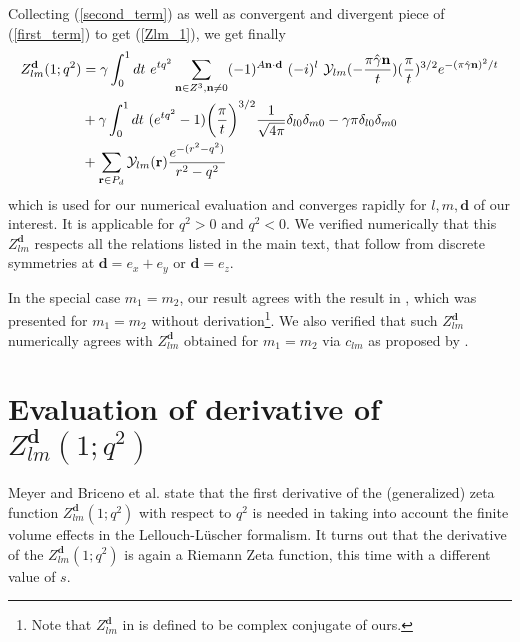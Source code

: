 \documentclass[a4paper,12pt]{book}
\begin{document}
Collecting (\ref{second_term}) as well as convergent and divergent piece of (\ref{first_term}) to get (\ref{Zlm_1}), we get  finally 
\begin{align}
Z_{lm}^{\mathbf{d}}(1;q^2)&=  \gamma \int _0^1 dt~ e^{tq^2} \sum_{\mathbf{n}\in Z^3,\mathbf{n}\not=0}   (-1)^{A\mathbf{n\cdot d}}~(-i)^l~ {\cal Y}_{lm}(-\frac{\pi\hat \gamma \mathbf{n}}{t}) (\frac{\pi}{t})^{3/2}  e^{-(\pi \hat \gamma \mathbf{n})^2/t}\nonumber \\
 &+\gamma  \int_0^1 dt~(e^{tq^2}-1)\biggl(\frac{\pi}{t}\biggr)^{3/2} \frac{1}{\sqrt{4\pi}}\delta_{l0}\delta_{m0}-\gamma\pi\delta_{l0}\delta_{m0}\nonumber\\
&+\sum_{\mathbf{r}\in P_{d}} {\cal Y}_{lm}(\mathbf{r}) \frac{e^{-(r^2-q^2)}}{r^2-q^2}\ 
\end{align}
which is used for our numerical evaluation and converges rapidly for $l,m,\mathbf{d}$  of our interest. It is applicable for $q^2>0$ and $q^2<0$. We verified numerically that this $Z_{lm}^{\mathbf{d}}$ respects all the relations listed in the main text, that follow from discrete symmetries at $\mathbf{d}=e_x+e_y$ or $\mathbf{d}=e_z$.   
 
In the special case $m_1=m_2$, our result agrees with the result in \cite{Feng:2011ah}, which was presented for $m_1=m_2$ without derivation\footnote{Note that 
$Z_{lm}^{\mathbf{d}}$ in \cite{Feng:2011ah} is defined to be complex conjugate of ours.}. 
We also verified that such $Z^{\mathbf{d}}_{lm}$  numerically agrees with  $Z^{\mathbf{d}}_{lm}$ obtained for $m_1=m_2$ via $c_{lm}$ as proposed by \cite{Kim:2005gf}.  

\section*{\texorpdfstring{Evaluation of derivative of $Z^{\mathbf{d}}_{lm}(1;q^2)$}{Evaluating the derivative of Zlm1q2}}

Meyer \cite{Meyer:2011um} and Briceno et al. \cite{Briceno:2014uqa} state that the first derivative of the (generalized) zeta function $Z_{lm}^{\mathbf{d}}(1;q^2)$ with respect to $q^2$ is needed in taking into account the finite volume effects in the Lellouch-L\"uscher formalism. It turns out that the derivative of the $Z_{lm}^{\mathbf{d}}(1;q^2)$ is again a Riemann Zeta function, this time with a different value of $s$.\\
\end{document}
